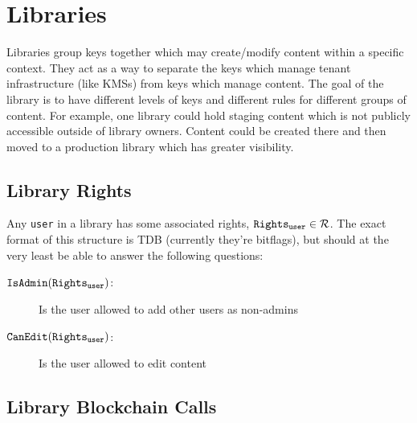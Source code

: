 \section{Libraries}
Libraries group keys together which may create/modify content within a specific context. 
They act as a way to separate the keys which manage tenant infrastructure (like KMSs) from keys which manage content.
The goal of the library is to have different levels of keys and different rules for different groups of content.
For example, one library could hold staging content which is not publicly accessible outside of library owners.
Content could be created there and then moved to a production library which has greater visibility.

\subsection{Library Rights}
Any \texttt{user} in a library has some associated rights, $\mathtt{Rights_{user}} \in \mathcal{R}$. 
The exact format of this structure is TDB (currently they're bitflags), but should at the very least be able to answer the following questions:

\begin{description}
  \item[$\mathtt{IsAdmin}(\mathtt{Rights_{user}})$:] Is the user allowed to add other users as non-admins
  \item[$\mathtt{CanEdit}(\mathtt{Rights_{user}})$:]  Is the user allowed to edit content
\end{description}

\subsection{Library Blockchain Calls}

